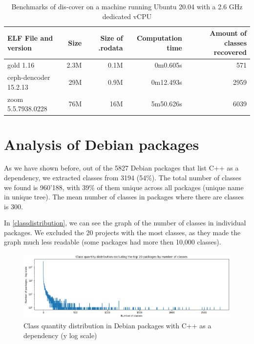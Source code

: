 \documentclass[a4paper,11pt,oneside]{report}
\begin{document}
\begin{table}[h]
  \centering
  {\small
  \begin{tabular}{l | r | r | r | r }
    ELF File and version & Size & Size of .rodata & Computation time & Amount 
of classes recovered  \\
    \hline
    gold 1.16 & 2.3M & 0.1M & 0m0.605s & 571 \\
    ceph-dencoder 15.2.13 & 29M & 0.9M & 0m12.493s & 2959 \\
    zoom 5.5.7938.0228 & 76M & 16M & 5m50.626s & 6039 
  \end{tabular}
  }

\caption{Benchmarks of dis-cover on a machine running Ubuntu 20.04 with a 2.6 
GHz dedicated vCPU}
\label{discoverbenchmarks}

\end{table}


\section{Analysis of Debian packages}
\label{debiansection}

As we have shown before, out of the 5827 Debian packages that list C++ as a 
dependency, we extracted classes from 3194 (54\%).
The total number of classes we found is 960'188, with 39\% of them unique 
across all packages (unique name in unique tree).
The mean number of classes in packages where there are classes is 300.

In \autoref{classdistribution}, we can see the graph of the number of classes
in individual packages. We excluded the 20 projects with the most classes, as
they made the graph much less readable (some packages had more then 10,000
classes).

\begin{figure}

\includegraphics[width=16cm]{package_distribution.png}
\caption{Class quantity distribution in Debian packages with C++ as a
dependency (y log scale)}
\label{classdistribution}

\end{figure}
\end{document}
